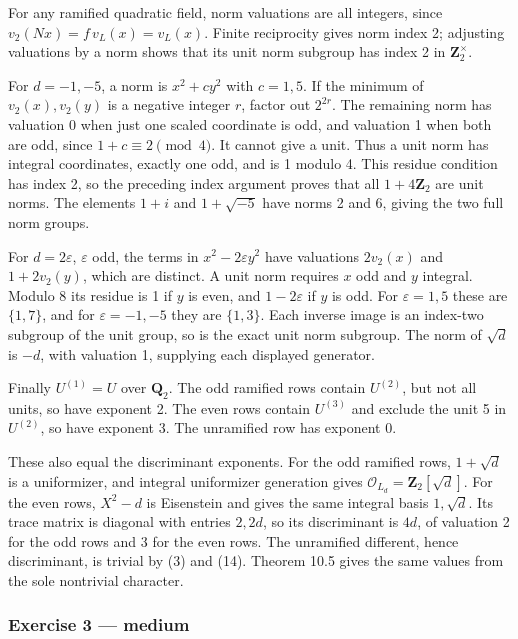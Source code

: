 \documentclass[11pt,a4paper]{article}
\begin{document}
For any ramified quadratic field, norm valuations are all integers,
since \(v_2(Nx)=f\,v_L(x)=v_L(x)\). Finite reciprocity gives norm index
2; adjusting valuations by a norm shows that its unit norm subgroup has
index 2 in \(\mathbf Z_2^\times\).

For \(d=-1,-5\), a norm is \(x^2+cy^2\) with \(c=1,5\). If the minimum
of \(v_2(x),v_2(y)\) is a negative integer \(r\), factor out \(2^{2r}\).
The remaining norm has valuation 0 when just one scaled coordinate is
odd, and valuation 1 when both are odd, since \(1+c\equiv2\pmod4\). It
cannot give a unit. Thus a unit norm has integral coordinates, exactly
one odd, and is 1 modulo 4. This residue condition has index 2, so the
preceding index argument proves that all \(1+4\mathbf Z_2\) are unit
norms. The elements \(1+i\) and \(1+\sqrt{-5}\) have norms 2 and 6,
giving the two full norm groups.

For \(d=2\varepsilon\), \(\varepsilon\) odd, the terms in
\(x^2-2\varepsilon y^2\) have valuations \(2v_2(x)\) and \(1+2v_2(y)\),
which are distinct. A unit norm requires \(x\) odd and \(y\) integral.
Modulo 8 its residue is 1 if \(y\) is even, and \(1-2\varepsilon\) if
\(y\) is odd. For \(\varepsilon=1,5\) these are \(\{1,7\}\), and for
\(\varepsilon=-1,-5\) they are \(\{1,3\}\). Each inverse image is an
index-two subgroup of the unit group, so is the exact unit norm
subgroup. The norm of \(\sqrt d\) is \(-d\), with valuation 1, supplying
each displayed generator.

Finally \(U^{(1)}=U\) over \(\mathbf Q_2\). The odd ramified rows
contain \(U^{(2)}\), but not all units, so have exponent 2. The even
rows contain \(U^{(3)}\) and exclude the unit 5 in \(U^{(2)}\), so have
exponent 3. The unramified row has exponent 0.

These also equal the discriminant exponents. For the odd ramified rows,
\(1+\sqrt d\) is a uniformizer, and integral uniformizer generation
gives \(\mathcal O_{L_d}=\mathbf Z_2[\sqrt d]\). For the even rows,
\(X^2-d\) is Eisenstein and gives the same integral basis \(1,\sqrt d\).
Its trace matrix is diagonal with entries \(2,2d\), so its discriminant
is \(4d\), of valuation 2 for the odd rows and 3 for the even rows. The
unramified different, hence discriminant, is trivial by (3) and (14).
Theorem 10.5 gives the same values from the sole nontrivial character.

\subsubsection{Exercise 3 --- medium}\label{exercise-3-medium}
\end{document}
